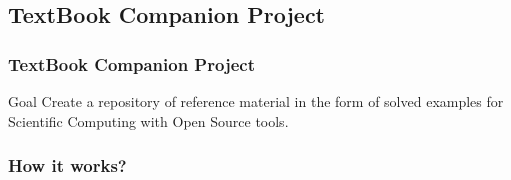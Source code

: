 \documentclass[compress,red]{beamer} %
\begin{document}
\subsection{TextBook Companion Project}

\begin{frame}
\frametitle{TextBook Companion Project}
\begin{block}{Goal}
Create a repository of reference material in the form of solved examples for Scientific Computing with Open Source tools.
\end{block}
\end{frame}

\begin{frame}
\frametitle{How it works?}
\begin{figure}
\centering
\mbox{
 \pause
{} \pause
{}} 
\end{figure}
\end{frame}
\end{document}
